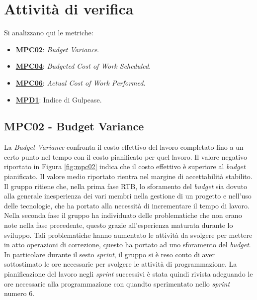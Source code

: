 \section{Attività di verifica}
Si analizzano qui le metriche:
\begin{itemize}
    \item \hyperref[s:mpc02]{\textbf{MPC02}}\textbf{}: \textit{Budget Variance}.
    \item \hyperref[s:mpc04]{\textbf{MPC04}}\textbf{}: \textit{Budgeted Cost of Work Scheduled}.
    \item \hyperref[s:mpc06]{\textbf{MPC06}}\textbf{}: \textit{Actual Cost of Work Performed}.
    \item \hyperref[s:mpd1]{\textbf{MPD1}}\textbf{}: Indice di Gulpease.
\end{itemize}

\subsection{MPC02 - Budget Variance}
\label{s:mpc02}
La \textit{Budget Variance} confronta il costo effettivo del lavoro completato fino a un certo punto nel tempo con il costo pianificato per quel lavoro.
Il valore negativo riportato in Figura \ref{fig:mpc02} indica che il costo effettivo è superiore al \textit{budget} pianificato.
Il valore medio riportato rientra nel margine di accettabilità stabilito. \\
Il gruppo ritiene che, nella prima fase RTB, lo sforamento del \textit{budget} sia dovuto alla generale inesperienza dei vari membri nella gestione di un progetto e nell'uso delle tecnologie, che ha portato alla necessità di incrementare il tempo di lavoro.\\
Nella seconda fase il gruppo ha individuato delle problematiche che non erano note nella fase precedente, questo grazie all'esperienza maturata durante lo sviluppo. 
Tali problematiche hanno aumentato le attività da svolgere per mettere in atto operazioni di correzione, questo ha portato ad uno sforamento del \textit{budget}.
In particolare durante il sesto \textit{sprint}, il gruppo si è reso conto di aver sottostimato le ore necessarie per svolgere le attività di programmazione.
La pianificazione del lavoro negli \textit{sprint} successivi è stata quindi rivista adeguando le ore necessarie alla programmazione con quandto sperimentato nello \textit{sprint} numero 6.

